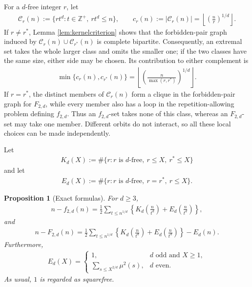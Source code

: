 \documentclass[12pt,a4paper,reqno]{amsart}
\numberwithin{equation}{section}
\newcommand{\cC}{\mathcal C}
\newcommand{\1}{\mathbf 1}
\theoremstyle{plain}
\newtheorem{proposition}[theorem]{Proposition}
\theoremstyle{definition}
\begin{document}
For a $d$-free integer $r$, let
\begin{align}
 \cC_r(n):=\{rt^d:t\in\mathbb{Z}^{+},\ rt^d\leq n\},
 \qquad
 c_r(n):=|\cC_r(n)|
 =\left\lfloor\left(\frac nr\right)^{1/d}\right\rfloor.\label{eq:classes}
\end{align}
If $r\neq r^*$, Lemma \ref{lem:kernelcriterion} shows that the
forbidden-pair graph induced by
$\cC_r(n)\cup\cC_{r^*}(n)$ is complete bipartite.  Consequently, an
extremal set takes the whole larger class and omits the smaller one;
if the two classes have the same size, either side may be chosen.
Its contribution to either complement is
\begin{align*}
 \min\{c_r(n),c_{r^*}(n)\}
 =\left\lfloor
 \left(\frac{n}{\max(r,r^*)}\right)^{1/d}
 \right\rfloor.
\end{align*}
If $r=r^*$, the distinct members of $\cC_r(n)$ form a clique in the
forbidden-pair graph for $F_{2,d}$, while every member also has a loop
in the repetition-allowing problem defining $f_{2,d}$.  Thus an
$f_{2,d}$-set takes none of this class, whereas an $F_{2,d}$-set may
take one member.  Different orbits do not interact, so all these local
choices can be made independently.

Let
\begin{align}
 K_d(X):=\#\{r:r\text{ is $d$-free},\ r\leq X,\ r^*\leq X\}
\label{eq:Kddef}
\end{align}
and let
\begin{align}
 E_d(X):=\#\{r:r\text{ is $d$-free},\ r=r^*,\ r\leq X\}.
\label{eq:Eddef}
\end{align}

\begin{proposition}[Exact formulas]\label{prop:exact}
For $d\geq3$,
\begin{align}
 n-f_{2,d}(n)
 =\frac12\sum_{t\leq n^{1/d}}
 \left\{
 K_d\left(\frac{n}{t^d}\right)
 +E_d\left(\frac{n}{t^d}\right)
 \right\},
\label{eq:exactf}
\end{align}
and
\begin{align}
 n-F_{2,d}(n)
 =\frac12\sum_{t\leq n^{1/d}}
 \left\{
 K_d\left(\frac{n}{t^d}\right)
 +E_d\left(\frac{n}{t^d}\right)
 \right\}-E_d(n).
\label{eq:exactF}
\end{align}
Furthermore,
\begin{align}
 E_d(X)=
 \begin{cases}
 1,&d\text{ odd and }X\geq1,\\[1mm]
 \displaystyle\sum_{s\leq X^{2/d}}\mu^2(s),&d\text{ even}.
\end{cases}
\tag{2.8}\label{eq:Edevaluation}
\end{align}
As usual, $1$ is regarded as squarefree.
\end{proposition}
\end{document}
